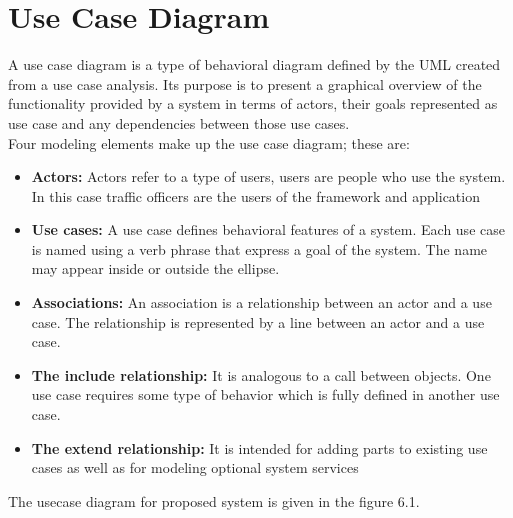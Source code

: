 \documentclass[openany,12pt]{report}
\begin{document}
	\section{Use Case Diagram}
	\hspace*{0.5in} A use case diagram is a type of behavioral diagram defined by the UML created from a use case analysis. Its purpose is to present a graphical overview of the functionality provided by a system in terms of actors, their goals represented as use case and any dependencies between those use cases.\\
	\hspace*{0.5in}Four modeling elements make up the use case diagram; these are:\\
	\begin{itemize}
		\item{\textbf{Actors:} Actors refer to a type of users, users are people who use the system. In this case traffic officers are the users of the framework and application}
		\item{\textbf{Use cases:} A use case defines behavioral features of a system. Each use case is named using a verb phrase that express a goal of the system. The name may appear inside or outside the ellipse.}
		\item{\textbf{Associations:} An association is a relationship between an actor and a use case. The relationship is represented by a line between an actor and a use case.}
		\item{\textbf{The include relationship:} It is analogous to a call between objects. One use case requires some type of behavior which is fully defined in  another use case.}
		\item{\textbf{The extend relationship:} It is intended for adding parts to existing use cases as well as for modeling optional system services}
	\end{itemize}
	The usecase diagram for proposed system is given in the figure 6.1.
\end{document}

